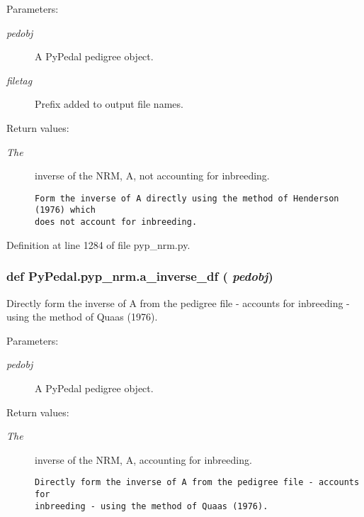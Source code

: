 \begin{Desc}
\item[Parameters:]
\begin{description}
\item[{\em pedobj}]A Py\-Pedal pedigree object. \item[{\em filetag}]Prefix added to output file names. \end{description}
\end{Desc}
\begin{Desc}
\item[Return values:]
\begin{description}
\item[{\em The}]inverse of the NRM, A, not accounting for inbreeding.

\footnotesize\begin{verbatim}Form the inverse of A directly using the method of Henderson (1976) which
does not account for inbreeding.
\end{verbatim}
\normalsize
 \end{description}
\end{Desc}


Definition at line 1284 of file pyp\_\-nrm.py.\hypertarget{namespacePyPedal_1_1pyp__nrm_4bb868be035fbfd5953a580b441cd566}{
\subsubsection[a\_\-inverse\_\-df]{\setlength{\rightskip}{0pt plus 5cm}def Py\-Pedal.pyp\_\-nrm.a\_\-inverse\_\-df ( {\em pedobj})}}
\label{namespacePyPedal_1_1pyp__nrm_4bb868be035fbfd5953a580b441cd566}


Directly form the inverse of A from the pedigree file - accounts for inbreeding - using the method of Quaas (1976). 

\begin{Desc}
\item[Parameters:]
\begin{description}
\item[{\em pedobj}]A Py\-Pedal pedigree object. \end{description}
\end{Desc}
\begin{Desc}
\item[Return values:]
\begin{description}
\item[{\em The}]inverse of the NRM, A, accounting for inbreeding.

\footnotesize\begin{verbatim}Directly form the inverse of A from the pedigree file - accounts for
inbreeding - using the method of Quaas (1976).
\end{verbatim}
\normalsize
 \end{description}
\end{Desc}


